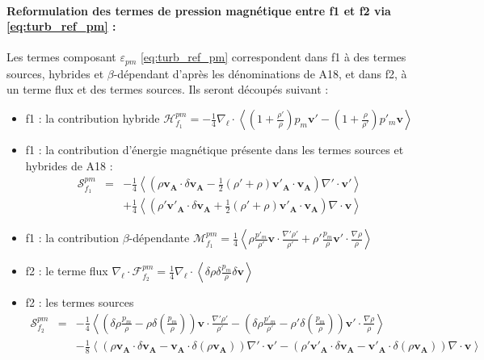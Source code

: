 \paragraph{Reformulation des termes de pression magnétique entre f1 et f2 via \eqref{eq:turb_ref_pm} : }
Les termes composant $\varepsilon_{pm}$ \eqref{eq:turb_ref_pm} correspondent dans f1 à des termes sources, hybrides et $\beta$-dépendant d'après les dénominations de A18, et dans f2, à un terme flux et des termes sources. 
Ils seront découpés suivant : 
\begin{itemize}
    \item f1 : la contribution hybride $\mathcal{H}^{pm}_{f_1} = - \frac{1}{4} \nabla_{\boldsymbol{\ell}} \cdot \left<\left(1+\frac{\rho'}{\rho}\right) p_m \boldsymbol{v'} - \left(1+\frac{\rho}{\rho'}\right)p'_m\boldsymbol{v} \right>$
    \item f1 : la contribution d'énergie magnétique présente dans les termes sources et hybrides de A18 : 
    \begin{eqnarray*}
        \mathcal{S}^{pm}_{f_1} &=&  - \frac{1}{4} \left<\left(\rho \boldsymbol{v_A} \cdot \delta \boldsymbol{v_A} - \frac{1}{2}\left(\rho' + \rho\right) \boldsymbol{v'_A} \cdot \boldsymbol{v_A}\right)\nabla' \cdot \boldsymbol{v'} \right>\\
        &&+ \frac{1}{4} \left<\left(\rho' \boldsymbol{v'_A} \cdot \delta \boldsymbol{v_A} + \frac{1}{2}\left(\rho' + \rho\right) \boldsymbol{v'_A} \cdot \boldsymbol{v_A}\right)\nabla \cdot \boldsymbol{v}\right>
    \end{eqnarray*}
    \item f1 : la contribution $\beta$-dépendante $\mathcal{M}^{pm}_{f_1} =  \frac{1}{4} \left<\rho \frac{p'_m}{\rho'} \boldsymbol{v} \cdot \frac{\nabla'\rho'}{\rho'} + \rho' \frac{p_m}{\rho} \boldsymbol{v'} \cdot \frac{\nabla\rho}{\rho} \right> $
    \item f2 : le terme flux $\nabla_{\boldsymbol{\ell}} \cdot \mathcal{F}^{pm}_{f_2} = \frac{1}{4} \nabla_{\boldsymbol{\ell}} \cdot\left<\delta \rho  \delta \frac{p_m}{\rho} \delta \boldsymbol{v}\right> $ 
    \item f2 : les termes sources 
    \begin{eqnarray*}
        \mathcal{S}^{pm}_{f_2} &=&  - \frac{1}{4} \left<\left(\delta \rho \frac{p_m}{\rho} - \rho \delta \left(\frac{p_m}{\rho}\right)\right)\boldsymbol{v} \cdot \frac{\nabla' \rho'}{\rho'} - \left(\delta \rho \frac{p'_m}{\rho'} - \rho' \delta \left(\frac{p_m}{\rho}\right)\right)\boldsymbol{v'} \cdot \frac{\nabla \rho}{\rho} \right>\\
        &&-\frac{1}{8}\left<\left(\rho \boldsymbol{v_A} \cdot \delta \boldsymbol{v_A} - \boldsymbol{v_A} \cdot \delta \left(\rho \boldsymbol{v_A}\right)\right)\nabla' \cdot \boldsymbol{v'} - \left(\rho' \boldsymbol{v'_A} \cdot \delta \boldsymbol{v_A} - \boldsymbol{v'_A} \cdot \delta \left(\rho \boldsymbol{v_A}\right)\right)\nabla \cdot \boldsymbol{v}\right>
        \end{eqnarray*}
\end{itemize}
